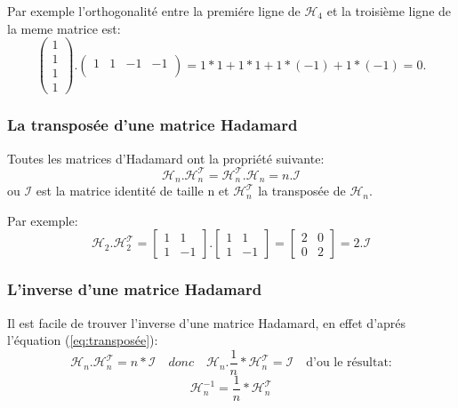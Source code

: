 \documentclass{article}
\begin{document}
Par exemple l'orthogonalité entre la premiére ligne de $\mathcal{H}_4$ et 
la troisième ligne de la meme matrice est:
\begin{equation*}
	\begin{pmatrix}
		1\\
		1\\
		1\\ 
		1
	\end {pmatrix}
	.
	\begin{pmatrix}
		1 & 1 & -1 & -1\\ 
	\end{pmatrix}
	= 1*1+1*1+1*(-1)+1*(-1) = 0. 
\end{equation*}

\subsubsection{La transposée d'une matrice Hadamard}

Toutes les matrices d'Hadamard ont la propriété suivante:
\begin{equation}\label{eq:transposée}
	\mathcal{H}_n . \mathcal{H}_{n}^{\mathcal{T}} =
	\mathcal{H}_{n}^{\mathcal{T}}. \mathcal{H}_n = n.\mathcal{I}
\end{equation}
ou $\mathcal{I}$ est la matrice identité de taille n et 
$\mathcal{H}_{n}^{\mathcal{T}}$ la transposée de $\mathcal{H}_n$.

Par exemple:
\begin{equation*}
	\mathcal{H}_2 . \mathcal{H}_{2}^{\mathcal{T}} =
	\begin{bmatrix}
		1 & 1\\
		1 & -1
	\end{bmatrix}
	.
	\begin{bmatrix}
		1 & 1\\
		1 & -1
	\end{bmatrix}
	=
	\begin{bmatrix}
		2 & 0\\
		0 & 2
	\end{bmatrix}
	= 2 . \mathcal{I}
\end{equation*}

\subsubsection{L'inverse d'une matrice Hadamard}

Il est facile de trouver l'inverse d'une matrice Hadamard, en effet d'aprés
l'équation (\ref{eq:transposée}):
\begin{equation*}
	\mathcal{H}_n . \mathcal{H}_{n}^{\mathcal{T}} = n * \mathcal{I}
	\quad
	donc 
	\quad
	\mathcal{H}_n . \frac{1}{n}*\mathcal{H}_{n}^{\mathcal{T}} = \mathcal{I}
	\quad
	\text{d'ou le résultat:} 
\end{equation*}
\begin{equation}\label{eq:inverse}
	\mathcal{H}_{n}^{-1} =  \frac{1}{n}*\mathcal{H}_{n}^{\mathcal{T}}
\end{equation}
\end{document}
